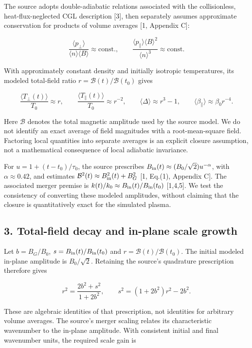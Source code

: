 The source adopts double-adiabatic relations associated with the
collisionless, heat-flux-neglected CGL description {[}3{]}, then
separately assumes approximate conservation for products of volume
averages {[}1, Appendix C{]}:

\[
\frac{\langle p_\perp\rangle}{\langle n\rangle\langle B\rangle}
\approx\mathrm{const.},
\qquad
\frac{\langle p_\parallel\rangle\langle B\rangle^2}
{\langle n\rangle^3}
\approx\mathrm{const.}
\]

With approximately constant density and initially isotropic
temperatures, its modeled total-field ratio
\(r=\mathcal B(t)/\mathcal B(t_0)\) gives

\[
\frac{\langle T_\perp(t)\rangle}{T_0}\approx r,\qquad
\frac{\langle T_\parallel(t)\rangle}{T_0}\approx r^{-2},\qquad
\langle\Delta\rangle\approx r^3-1,\qquad
\langle\beta_\parallel\rangle\approx\beta_0r^{-4}.
\]

Here \(\mathcal B\) denotes the total magnetic amplitude used by the
source model. We do not identify an exact average of field magnitudes
with a root-mean-square field. Factoring local quantities into separate
averages is an explicit closure assumption, not a mathematical
consequence of local adiabatic invariance.

For \(u=1+(t-t_0)/\tau_0\), the source prescribes
\(B_{\rm in}(t)\approx(B_0/\sqrt2)u^{-\alpha}\), with
\(\alpha\approx0.42\), and estimates
\(\mathcal B^2(t)\approx B_{\rm in}^2(t)+B_G^2\) {[}1, Eq.(1), Appendix
C{]}. The associated merger premise is
\(k(t)/k_0\approx B_{\rm in}(t)/B_{\rm in}(t_0)\) {[}1,4,5{]}. We test
the consistency of converting these modeled amplitudes, without claiming
that the closure is quantitatively exact for the simulated plasma.

\subsection{3. Total-field decay and in-plane scale
growth}\label{total-field-decay-and-in-plane-scale-growth}

Let \(b=B_G/B_0\), \(s=B_{\rm in}(t)/B_{\rm in}(t_0)\) and
\(r=\mathcal B(t)/\mathcal B(t_0)\). The initial modeled in-plane
amplitude is \(B_0/\sqrt2\). Retaining the source's quadrature
prescription therefore gives

\[
r^2=\frac{2b^2+s^2}{1+2b^2},\qquad
s^2=(1+2b^2)r^2-2b^2. \tag{1}
\]

These are algebraic identities of that prescription, not identities for
arbitrary volume averages. The source's merger scaling relates its
characteristic wavenumber to the in-plane amplitude. With consistent
initial and final wavenumber units, the required scale gain is


